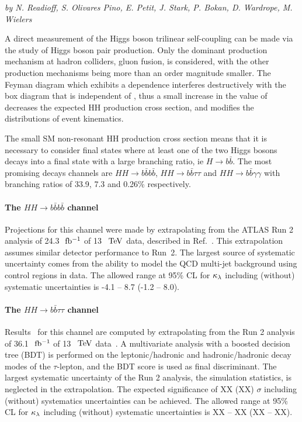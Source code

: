 \begin{center}
\textit{by N. Readioff, S. Olivares Pino, E. Petit, J. Stark, P. Bokan, D. Wardrope, M. Wielers}
\end{center}

A direct measurement of the Higgs boson trilinear self-coupling \lHHH can be made via the study of Higgs boson pair production. Only the dominant production mechanism at hadron colliders, gluon fusion, is considered, with the other production mechanisms being more than an order magnitude smaller.
The Feyman diagram which exhibits a \lHHH dependence interferes destructively with the box diagram that is independent of \lHHH , thus a small increase in the value of \lHHH decreases the expected HH production cross section, and modifies the distributions of event kinematics.

The small SM non-resonant HH production cross section means that it is necessary to consider final states where at least one of the two Higgs bosons decays into a final state with a large branching ratio, ie $H \rightarrow b\bar{b}$. The most promising decays channels are $HH \rightarrow b\bar{b}b\bar{b}$, $HH \rightarrow b\bar{b}\tau\tau$ and $HH \rightarrow b\bar{b}\gamma\gamma$ with branching ratios of 33.9, 7.3 and 0.26\% respectively.

%
\paragraph{The $HH \rightarrow b\bar{b}b\bar{b}$ channel}

Projections for this channel were made by extrapolating from the ATLAS Run 2 analysis of 24.3 $\rm~fb^{-1}$ of 13~$~\text{TeV}$ data, described in Ref.~\cite{ITKPixelTDR}. This extrapolation assumes similar detector performance to Run~2. The largest source of systematic uncertainty comes from the ability to model the QCD multi-jet background using control regions in data. The allowed range at 95\% CL for $\kappa_{\lambda}$ including (without) systematic uncertainties is -4.1 -- 8.7 (-1.2 -- 8.0).

%
\paragraph{The $HH \rightarrow b\bar{b}\tau\tau$ channel}

Results~\cite{ATLASHHPUBnote} for this channel are computed by extrapolating from the Run 2 analysis of 36.1 $\rm~fb^{-1}$ of 13~$~\text{TeV}$ data~\cite{ATLASrun2HHbbtautau}. A multivariate analysis with a boosted decision tree (BDT) is performed on the leptonic/hadronic and hadronic/hadronic decay modes of the $\tau$-lepton, and the BDT score is used as final discriminant. The largest systematic uncertainty of the Run 2 analysis, the simulation statistics, is neglected in the extrapolation. The expected significance of XX (XX) $\sigma$ including (without) systematics uncertainties can be achieved. The allowed range at 95\% CL for $\kappa_{\lambda}$ including (without) systematic uncertainties is XX -- XX (XX -- XX).


